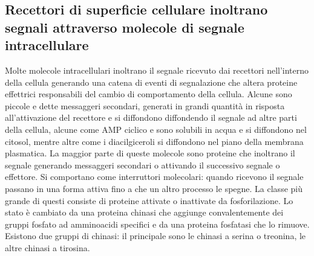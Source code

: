 \subsection{Recettori di superficie cellulare inoltrano segnali attraverso molecole di segnale intracellulare}
Molte molecole intracellulari inoltrano il segnale ricevuto dai recettori nell'interno della cellula generando una catena di eventi di segnalazione che altera proteine effettrici 
responsabili del cambio di comportamento della cellula. Alcune sono piccole e dette messaggeri secondari, generati in grandi quantit\`a in risposta all'attivazione del recettore e 
si diffondono diffondendo il segnale ad altre parti della cellula, alcune come AMP ciclico e  sono solubili in acqua e si diffondono nel citosol, mentre altre come i 
diacilgiceroli si diffondono nel piano della membrana plasmatica. La maggior parte di queste molecole sono proteine che inoltrano il segnale generando messaggeri secondari o attivando
il successivo segnale o effettore. Si comportano come interruttori molecolari: quando ricevono il segnale passano in una forma attiva fino a che un altro processo le spegne. La classe 
pi\`u grande di questi consiste di proteine attivate o inattivate da fosforilazione. Lo stato \`e cambiato da una proteina chinasi che aggiunge convalentemente dei gruppi fosfato ad
amminoacidi specifici e da una proteina fosfatasi che lo rimuove. Esistono due gruppi di chinasi: il principale sono le chinasi a serina o treonina, le altre chinasi a tirosina. 
